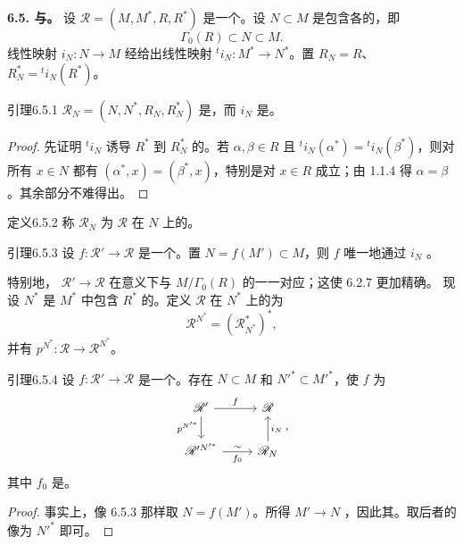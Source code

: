 \textbf{6.5. 与。}
设 $\mathscr R=(M,M^*,R,R^*)$ 是一个。设 $N\subset M$ 是包含各的，即
\[\Gamma_0(R)\subset N\subset M.\]
线性映射 $i_N:N\to M$ 经给出线性映射 ${}^ti_N:M^*\to N^*$。置 $R_N=R$、$R_N^*={}^ti_N(R^*)$。
\begin{SGAresult}{引理}{6.5.1}
$\mathscr R_N=(N,N^*,R_N,R_N^*)$ 是，而 $i_N$ 是。
\end{SGAresult}
\begin{proof}
先证明 ${}^ti_N$ 诱导 $R^*$ 到 $R_N^*$ 的。若 $\alpha,\beta\in R$ 且 ${}^ti_N(\alpha^*)={}^ti_N(\beta^*)$，则对所有 $x\in N$ 都有 $(\alpha^*,x)=(\beta^*,x)$，特别是对 $x\in R$ 成立；由 1.1.4 得 $\alpha=\beta$。其余部分不难得出。
\end{proof}
\begin{SGAresult}{定义}{6.5.2}
称 $\mathscr R_N$ 为 $\mathscr R$ 在 $N$ 上的。
\end{SGAresult}
\begin{SGAresult}{引理}{6.5.3}
设 $f:\mathscr R'\to\mathscr R$ 是一个。置 $N=f(M')\subset M$，则 $f$ 唯一地通过 $i_N$ 。
\end{SGAresult}
特别地， $\mathscr R'\to\mathscr R$ 在意义下与 $M/\Gamma_0(R)$ 的一一对应；这使 6.2.7 更加精确。
现设 $N^*$ 是 $M^*$ 中包含 $R^*$ 的。定义 $\mathscr R$ 在 $N^*$ 上的为
\[\mathscr R^{N^*}=(\mathscr R^*_{N^*})^*,\]
并有 $p^{N^*}:\mathscr R\to\mathscr R^{N^*}$。
\begin{SGAresult}{引理}{6.5.4}
设 $f:\mathscr R'\to\mathscr R$ 是一个。存在 $N\subset M$ 和 $N'^*\subset M'^*$，使 $f$ 为
\[\begin{tikzcd}
\mathscr R'\arrow[r,"f"]\arrow[d,"p^{N'^*}"']&\mathscr R\\
\mathscr R'^{N'^*}\arrow[r,"f_0"',"\sim"]&\mathscr R_N\arrow[u,"i_N"']
\end{tikzcd},\]
其中 $f_0$ 是。
\end{SGAresult}
\begin{proof}
事实上，像 6.5.3 那样取 $N=f(M')$。所得 $M'\to N$ ，因此其。取后者的像为 $N'^*$ 即可。
\end{proof}
